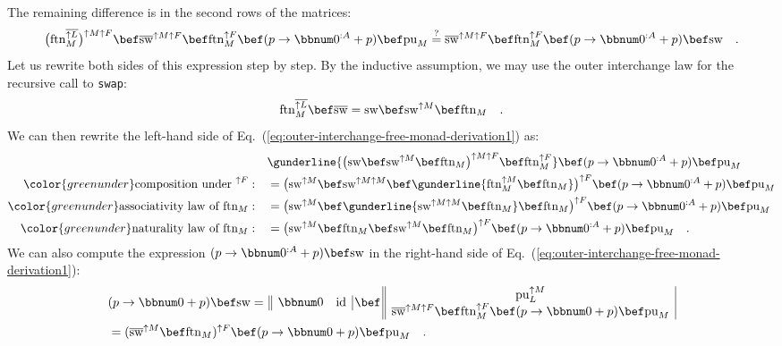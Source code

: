 The remaining difference is in the second rows of the matrices:
\begin{equation}
\big(\text{ftn}_{M}^{\overline{\uparrow L}}\big)^{\uparrow M\uparrow F}\bef\overline{\text{sw}}^{\uparrow M\uparrow F}\bef\text{ftn}_{M}^{\uparrow F}\bef(p\rightarrow\bbnum 0^{:A}+p)\bef\text{pu}_{M}\overset{?}{=}\overline{\text{sw}}^{\uparrow M\uparrow F}\bef\text{ftn}_{M}^{\uparrow F}\bef(p\rightarrow\bbnum 0^{:A}+p)\bef\text{sw}\quad.\label{eq:outer-interchange-free-monad-derivation1}
\end{equation}
Let us rewrite both sides of this expression step by step. By the
inductive assumption, we may use the outer interchange law for the
recursive call to \lstinline!swap!:
\[
\text{ftn}_{M}^{\overline{\uparrow L}}\bef\overline{\text{sw}}=\text{sw}\bef\text{sw}^{\uparrow M}\bef\text{ftn}_{M}\quad.
\]
We can then rewrite the left-hand side of Eq.~(\ref{eq:outer-interchange-free-monad-derivation1})
as:
\begin{align*}
 & \gunderline{\big(\text{sw}\bef\text{sw}^{\uparrow M}\bef\text{ftn}_{M}\big)^{\uparrow M\uparrow F}\bef\text{ftn}_{M}^{\uparrow F}}\bef(p\rightarrow\bbnum 0^{:A}+p)\bef\text{pu}_{M}\\
{\color{greenunder}\text{composition under }^{\uparrow F}:}\quad & =\big(\text{sw}^{\uparrow M}\bef\text{sw}^{\uparrow M\uparrow M}\bef\gunderline{\text{ftn}_{M}^{\uparrow M}\bef\text{ftn}_{M}}\big)^{\uparrow F}\bef(p\rightarrow\bbnum 0^{:A}+p)\bef\text{pu}_{M}\\
{\color{greenunder}\text{associativity law of }\text{ftn}_{M}:}\quad & =\big(\text{sw}^{\uparrow M}\bef\gunderline{\text{sw}^{\uparrow M\uparrow M}\bef\text{ftn}_{M}}\bef\text{ftn}_{M}\big)^{\uparrow F}\bef(p\rightarrow\bbnum 0^{:A}+p)\bef\text{pu}_{M}\\
{\color{greenunder}\text{naturality law of }\text{ftn}_{M}:}\quad & =\big(\text{sw}^{\uparrow M}\bef\text{ftn}_{M}\bef\text{sw}^{\uparrow M}\bef\text{ftn}_{M}\big)^{\uparrow F}\bef(p\rightarrow\bbnum 0^{:A}+p)\bef\text{pu}_{M}\quad.
\end{align*}
We can also compute the expression $(p\rightarrow\bbnum 0^{:A}+p)\bef\text{sw}$
in the right-hand side of Eq.~(\ref{eq:outer-interchange-free-monad-derivation1}):
\begin{align*}
 & (p\rightarrow\bbnum 0+p)\bef\text{sw}=\,\begin{array}{||cc|}
\bbnum 0 & \text{id}\end{array}\,\bef\,\begin{array}{||c|}
\text{pu}_{L}^{\uparrow M}\\
\overline{\text{sw}}^{\uparrow M\uparrow F}\bef\text{ftn}_{M}^{\uparrow F}\bef(p\rightarrow\bbnum 0+p)\bef\text{pu}_{M}
\end{array}\\
 & =(\overline{\text{sw}}^{\uparrow M}\bef\text{ftn}_{M})^{\uparrow F}\bef(p\rightarrow\bbnum 0+p)\bef\text{pu}_{M}\quad.
\end{align*}
